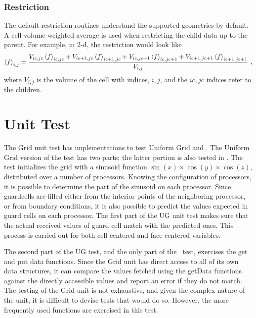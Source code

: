 \subsubsection{Restriction}%
The default restriction routines understand the supported geometries
by default.  A cell-volume weighted average is used when restricting
the child data up to the parent.  For example, in 2-d, the restriction
would look like
\begin{equation}
\left<f\right>_{i,j} = \frac{V_{ic,jc} \left<f\right>_{ic,jc} +
                        V_{ic+1,jc} \left<f\right>_{ic+1,jc} +
                        V_{ic,jc+1} \left<f\right>_{ic,jc+1} +
                        V_{ic+1,jc+1} \left<f\right>_{ic+1,jc+1}}
                       {V_{i,j}}~,
\end{equation}
where $V_{i,j}$ is the volume of the cell with indices, $i, j$, and the
$ic, jc$ indices refer to the children.



\section{Unit Test}

The \unit{Grid} unit test has implementations to test  Uniform Grid
and \Paramesh. The Uniform Grid version of the test has two parts; the
latter portion is also tested in \Paramesh.
The test initializes the grid with a sinusoid function
\(\sin(x)\times\cos(y)\times\cos(z)\), distributed over a number of
processors. Knowing the configuration of processors, it is possible to
determine the part of the sinusoid on each processor. Since guardcells
are filled either from the interior points of the neighboring
processor, or from boundary conditions, it is also possible to predict
the values expected in guard cells on each processor. The first part of
the UG unit test makes sure that the actual received values of guard
cell match with the predicted ones. This process is carried out for
both cell-centered and face-centered variables.

The second part of the UG test, and the only part of the \Paramesh\ test,
exercises the get and put data functions. Since the \unit{Grid} unit
has direct access to all of its own data structures, it can compare
the values fetched using the getData functions against the directly
accessible values and report an error if they do not match.
The testing of the \unit{Grid} unit is not exhaustive, and given the complex
nature of the unit, it is difficult to devise tests that would do
so. However, the more frequently used functions are exercised in this test.


